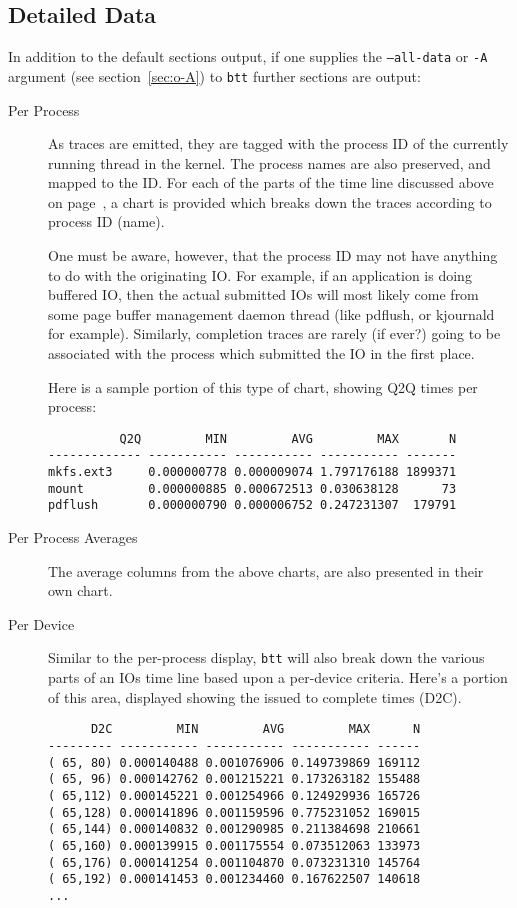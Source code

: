 \documentclass{article}
\begin{document}
\newpage
\subsection{\label{sec:detailed-data}Detailed Data}

  In addition to the default sections output, if one supplies the
  \texttt{--all-data} or \texttt{-A} argument (see section~\ref{sec:o-A})
  to \texttt{btt} further sections are output:

\begin{description}
  \item[Per Process] As traces are emitted, they are tagged with the
  process ID of the currently running thread in the kernel. The process
  names are also preserved, and mapped to the ID. For each of the parts
  of the time line discussed above on page~\pageref{tl-defs}, a chart is
  provided which breaks down the traces according to process ID (name).

  One must be aware, however, that the process ID may not have anything
  to do with the originating IO. For example, if an application is
  doing buffered IO, then the actual submitted IOs will most likely
  come from some page buffer management daemon thread (like pdflush,
  or kjournald for example). Similarly, completion traces are rarely
  (if ever?) going to be associated with the process which submitted
  the IO in the first place.

  Here is a sample portion of this type of chart, showing Q2Q times
  per process:

\begin{verbatim}
          Q2Q         MIN         AVG         MAX       N
------------- ----------- ----------- ----------- -------
mkfs.ext3     0.000000778 0.000009074 1.797176188 1899371
mount         0.000000885 0.000672513 0.030638128      73
pdflush       0.000000790 0.000006752 0.247231307  179791
\end{verbatim}

  \item[Per Process Averages] The average columns from the above charts,
  are also presented in their own chart.

  \item[Per Device] Similar to the per-process display, \texttt{btt}
  will also break down the various parts of an IOs time line based upon a
  per-device criteria. Here's a portion of this area, displayed showing
  the issued to complete times (D2C).

\begin{verbatim}
      D2C         MIN         AVG         MAX      N
--------- ----------- ----------- ----------- ------
( 65, 80) 0.000140488 0.001076906 0.149739869 169112
( 65, 96) 0.000142762 0.001215221 0.173263182 155488
( 65,112) 0.000145221 0.001254966 0.124929936 165726
( 65,128) 0.000141896 0.001159596 0.775231052 169015
( 65,144) 0.000140832 0.001290985 0.211384698 210661
( 65,160) 0.000139915 0.001175554 0.073512063 133973
( 65,176) 0.000141254 0.001104870 0.073231310 145764
( 65,192) 0.000141453 0.001234460 0.167622507 140618
...
\end{verbatim}


\end{description}
\end{document}
